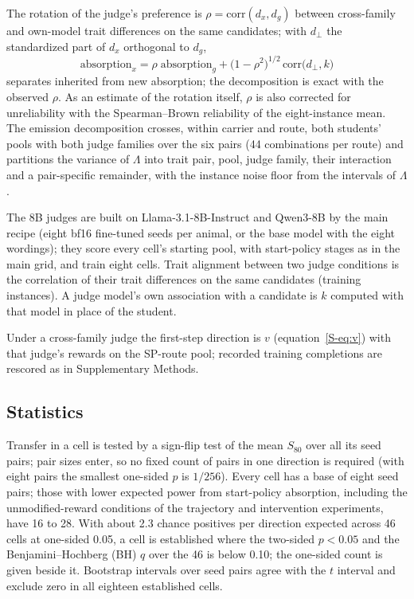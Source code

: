 The rotation of the judge's preference is $\rho = \mathrm{corr}(d_x, d_g)$ between cross-family and own-model trait differences on the same candidates; with $d_\perp$ the standardized part of $d_x$ orthogonal to $d_g$,
\begin{equation}
\mathrm{absorption}_x = \rho\;\mathrm{absorption}_g + \big(1 - \rho^2\big)^{1/2}\,\mathrm{corr}\big(d_\perp, k\big)
\label{eq:rot}
\end{equation}
separates inherited from new absorption; the decomposition is exact with the observed $\rho$. As an estimate of the rotation itself, $\rho$ is also corrected for unreliability with the Spearman--Brown reliability\cite{spearman1910correlation,brown1910some} of the eight-instance mean. The emission decomposition crosses, within carrier and route, both students' pools with both judge families over the six pairs (44 combinations per route) and partitions the variance of $\Lambda$ into trait pair, pool, judge family, their interaction and a pair-specific remainder, with the instance noise floor from the intervals of $\Lambda$.

The 8B judges are built on Llama-3.1-8B-Instruct\cite{r15} and Qwen3-8B\cite{r16} by the main recipe (eight bf16 fine-tuned seeds per animal, or the base model with the eight wordings); they score every cell's starting pool, with start-policy stages as in the main grid, and train eight cells. Trait alignment between two judge conditions is the correlation of their trait differences on the same candidates (training instances). A judge model's own association with a candidate is $k$ computed with that model in place of the student.

Under a cross-family judge the first-step direction is $v$ (equation~\eqref{S-eq:v}) with that judge's rewards on the SP-route pool; recorded training completions are rescored as in Supplementary Methods.

\subsection{Statistics}
\label{sec:m-stats}

Transfer in a cell is tested by a sign-flip test of the mean $S_{80}$\cite{fisher1935design} over all its seed pairs; pair sizes enter, so no fixed count of pairs in one direction is required (with eight pairs the smallest one-sided $p$ is $1/256$). Every cell has a base of eight seed pairs; those with lower expected power from start-policy absorption, including the unmodified-reward conditions of the trajectory and intervention experiments, have 16 to 28. With about 2.3 chance positives per direction expected across 46 cells at one-sided 0.05, a cell is established where the two-sided $p < 0.05$ and the Benjamini--Hochberg\cite{benjamini1995controlling} (BH) $q$ over the 46 is below 0.10; the one-sided count is given beside it. Bootstrap intervals\cite{efron1979bootstrap} over seed pairs agree with the $t$ interval and exclude zero in all eighteen established cells.


